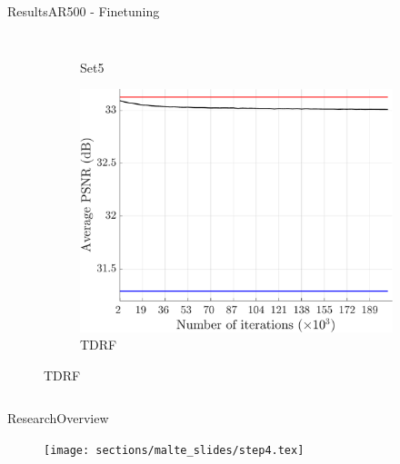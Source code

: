 \begin{frame}{Results}{AR500 - Finetuning}
\begin{columns}
\begin{figure}
\begin{subfigure}[b]{0.48\textwidth}
                \vspace*{-2mm}
                \caption*{\scriptsize Set5}
            \end{subfigure}
            \begin{subfigure}[b]{0.48\textwidth}
                \includegraphics[width=\textwidth]{sections/malte_slides/fine23-results-tdrf.pdf}
                \vspace*{-2mm}
                \caption*{\scriptsize TDRF}
            \end{subfigure}
        \end{figure}

    \end{columns}
\end{frame}

\begin{frame}{Research}{Overview}
    \begin{figure}
        \centering
        \texttt{[image: sections/malte\_slides/step4.tex]}
    \end{figure}
\end{frame}

